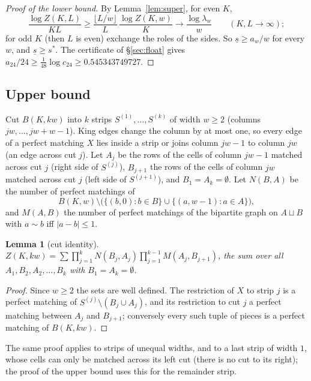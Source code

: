 \documentclass[11pt]{amsart}
\newtheorem{lemma}[theorem]{Lemma}
\theoremstyle{definition}
\theoremstyle{remark}
\begin{document}
\begin{proof}[Proof of the lower bound]
By Lemma~\ref{lem:super}, for even $K$,
\[
  \frac{\log Z(K, L)}{KL} \ge \frac{\lfloor L/w\rfloor}{L}\,\frac{\log Z(K, w)}{K}
  \longrightarrow \frac{\log\lambda_w}{w} \qquad (K, L \to \infty);
\]
for odd $K$ (then $L$ is even) exchange the roles of the sides. So $\underline s \ge a_w / w$ for every $w$, and
$\underline s \ge s^*$. The certificate of \S\ref{sec:float} gives
$a_{24}/24 \ge \frac{1}{48}\log c_{24} \ge 0.545343749727$.
\end{proof}

\subsection{Upper bound}
Cut $B(K, kw)$ into $k$ strips $S^{(1)}, \dots, S^{(k)}$ of width $w \ge 2$ (columns
$jw, \dots, jw + w - 1$). King edges change the column by at most one, so every edge of a perfect
matching $X$ lies inside a strip or joins column $jw - 1$ to column $jw$ (an edge across cut $j$).
Let $A_j$ be the rows of the cells of column $jw - 1$ matched across cut $j$ (right side of
$S^{(j)}$), $B_{j+1}$ the rows of the cells of column $jw$ matched across cut $j$ (left side of
$S^{(j+1)}$), and $B_1 = A_k = \emptyset$. Let $N(B, A)$ be the number of perfect matchings of
\[
  B(K, w) \setminus \bigl(\{(b, 0) : b \in B\} \cup \{(a, w-1) : a \in A\}\bigr),
\]
and $M(A, B)$ the number of perfect matchings of the bipartite graph on $A \sqcup B$ with
$a \sim b$ iff $|a - b| \le 1$.

\begin{lemma}[cut identity]\label{lem:cut}
$Z(K, kw) = \sum \prod_{j=1}^{k} N(B_j, A_j) \prod_{j=1}^{k-1} M(A_j, B_{j+1})$, the sum over all
$A_1, B_2, A_2, \dots, B_k$ with $B_1 = A_k = \emptyset$.
\end{lemma}
\begin{proof}
Since $w \ge 2$ the sets are well defined. The restriction of $X$ to strip $j$ is a perfect matching
of $S^{(j)} \setminus (B_j \cup A_j)$, and its restriction to cut $j$ a perfect matching between
$A_j$ and $B_{j+1}$; conversely every such tuple of pieces is a perfect matching of $B(K, kw)$.
\end{proof}

The same proof applies to strips of unequal widths, and to a last strip of width $1$, whose cells
can only be matched across its left cut (there is no cut to its right); the proof of the upper
bound uses this for the remainder strip.
\end{document}
